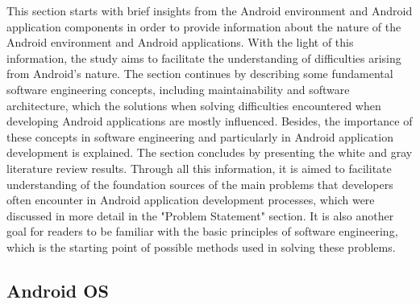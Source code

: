 This section starts with brief insights from the Android environment and Android application components in order to provide information about the nature of the Android environment and Android applications. With the light of this information, the study aims to facilitate the understanding of difficulties arising from Android's nature. The section continues by describing some fundamental software engineering concepts, including maintainability and software architecture, which the solutions when solving difficulties encountered when developing Android applications are mostly influenced. Besides, the importance of these concepts in software engineering and particularly in Android application development is explained. The section concludes by presenting the white and gray literature review results. Through all this information, it is aimed to facilitate understanding of the foundation sources of the main problems that developers often encounter in Android application development processes, which were discussed in more detail in the "Problem Statement" section. It is also another goal for readers to be familiar with the basic principles of software engineering, which is the starting point of possible methods used in solving these problems.
\subsection{Android OS}


%

%

%

%

